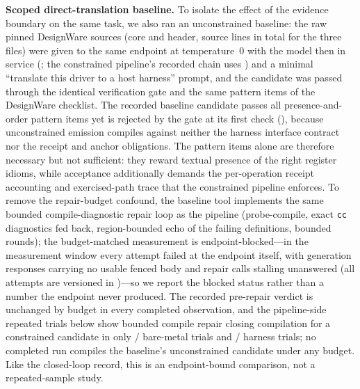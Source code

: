\textbf{Scoped direct-translation baseline.} To isolate the effect of the
evidence boundary on the same task, we also ran an unconstrained baseline:
the raw pinned DesignWare sources (core and header, \DwSourceLines{} source
lines in total for the three files) were given to the same endpoint at
temperature~0 with the model then in service (\DirectLlmModelId{}; the
constrained pipeline's recorded chain uses \LlmModelId{}) and a minimal
``translate this driver to a host harness'' prompt, and the
candidate was passed through the identical verification gate and the same
pattern items of the DesignWare checklist. The recorded baseline candidate
passes all \DirectLlmPatternTotal{} presence-and-order pattern items yet
is rejected by the gate at its first check (\DirectLlmFirstFail{}),
because unconstrained emission compiles against neither the harness
interface contract nor the receipt and anchor obligations. The pattern
items alone are therefore necessary but not sufficient: they reward
textual presence of the right register idioms, while acceptance
additionally demands the per-operation receipt accounting and
exercised-path trace that the constrained pipeline enforces. To remove the
repair-budget confound, the baseline tool implements the same bounded
compile-diagnostic repair loop as the pipeline (probe-compile, exact
\texttt{cc} diagnostics fed back, region-bounded echo of the failing
definitions, bounded rounds); the budget-matched measurement is
endpoint-blocked---in the measurement window every attempt failed at the
endpoint itself, with generation responses carrying no usable fenced body
and repair calls stalling unanswered (all attempts are versioned in
)---so
we report the blocked status rather than a number the endpoint never
produced. The recorded pre-repair verdict is unchanged by budget in every
completed observation, and the pipeline-side repeated trials below show
bounded compile repair closing compilation for a constrained candidate in
only \DwBareTrialsPostCompile{}/\DwBareTrialsN{} bare-metal trials and
\DwHarnTrialsPostCompile{}/\DwHarnTrialsN{} harness trials; no completed
run compiles the baseline's unconstrained candidate under any budget.
Like the closed-loop record, this is an endpoint-bound comparison, not a
repeated-sample study.

